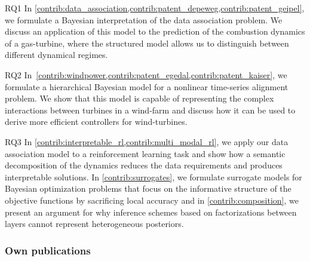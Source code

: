 \begin{compactdesc}
    \item[RQ1]
    In \cref{contrib:data_association,contrib:patent_depeweg,contrib:patent_geipel}, we formulate a Bayesian interpretation of the data association problem.
    We discuss an application of this model to the prediction of the combustion dynamics of a gas-turbine, where the structured model allows us to distinguish between different dynamical regimes.
    \item[RQ2]
    In~\cref{contrib:windpower,contrib:patent_egedal,contrib:patent_kaiser}, we formulate a hierarchical Bayesian model for a nonlinear time-series alignment problem.
    We show that this model is capable of representing the complex interactions between turbines in a wind-farm and discuss how it can be used to derive more efficient controllers for wind-turbines.
    \item[RQ3]
    In \cref{contrib:interpretable_rl,contrib:multi_modal_rl}, we apply our data association model to a reinforcement learning task and show how a semantic decomposition of the dynamics reduces the data requirements and produces interpretable solutions.
    In \cref{contrib:surrogates}, we formulate surrogate models for Bayesian optimization problems that focus on the informative structure of the objective functions by sacrificing local accuracy and in \cref{contrib:composition}, we present an argument for why inference schemes based on factorizations between layers cannot represent heterogeneous posteriors.
\end{compactdesc}


\subsubsection{Own publications}

